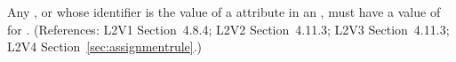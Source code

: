 Any \Compartment, \Species or \Parameter whose identifier is the value of a
 attribute in an \AssignmentRule, must have a value of
 for .  (References: L2V1 Section~4.8.4; L2V2
Section~4.11.3; L2V3 Section~4.11.3; L2V4 Section~\ref{sec:assignmentrule}.)
